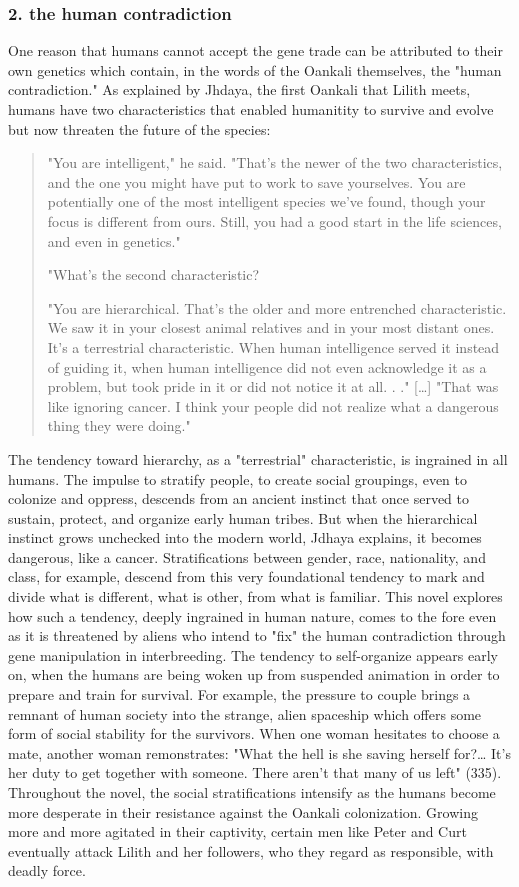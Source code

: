 \documentclass[11pt]{article}
\begin{document}
\subsubsection{2. the human contradiction}
\label{sec:org52ac263}
One reason that humans cannot accept the gene trade can be attributed
to their own genetics which contain, in the words of the Oankali
themselves, the "human contradiction." As explained by Jhdaya, the
first Oankali that Lilith meets, humans have two characteristics that
enabled humanitity to survive and evolve but now threaten the future
of the species:
\begin{quote}
"You are intelligent," he said. "That's the newer of the two
characteristics, and the one you might have put to work to save
yourselves. You are potentially one of the most intelligent species
we've found, though your focus is different from ours. Still, you had
a good start in the life sciences, and even in genetics."

"What's the second characteristic?  

"You are hierarchical. That's the older and more entrenched
characteristic. We saw it in your closest animal relatives and in your
most distant ones. It's a terrestrial characteristic. When human
intelligence served it instead of guiding it, when human intelligence
did not even acknowledge it as a problem, but took pride in it or did
not notice it at all. . ." [\ldots{}] "That was like ignoring cancer. I
think your people did not realize what a dangerous thing they were
doing."
\end{quote}
The tendency toward hierarchy, as a "terrestrial" characteristic, is
ingrained in all humans. The impulse to stratify people, to create
social groupings, even to colonize and oppress, descends from an
ancient instinct that once served to sustain, protect, and organize
early human tribes. But when the hierarchical instinct grows unchecked
into the modern world, Jdhaya explains, it becomes dangerous, like a
cancer. Stratifications between gender, race, nationality, and class,
for example, descend from this very foundational tendency to mark and
divide what is different, what is other, from what is familiar. This
novel explores how such a tendency, deeply ingrained in human nature,
comes to the fore even as it is threatened by aliens who intend to
"fix" the human contradiction through gene manipulation in
interbreeding. The tendency to self-organize appears early on, when
the humans are being woken up from suspended animation in order to
prepare and train for survival. For example, the pressure to couple
brings a remnant of human society into the strange, alien spaceship
which offers some form of social stability for the survivors. When one
woman hesitates to choose a mate, another woman remonstrates: "What
the hell is she saving herself for?\ldots{} It's her duty to get together
with someone. There aren't that many of us left" (335). Throughout the
novel, the social stratifications intensify as the humans become more
desperate in their resistance against the Oankali
colonization. Growing more and more agitated in their captivity,
certain men like Peter and Curt eventually attack Lilith and her
followers, who they regard as responsible, with deadly force.
\end{document}
